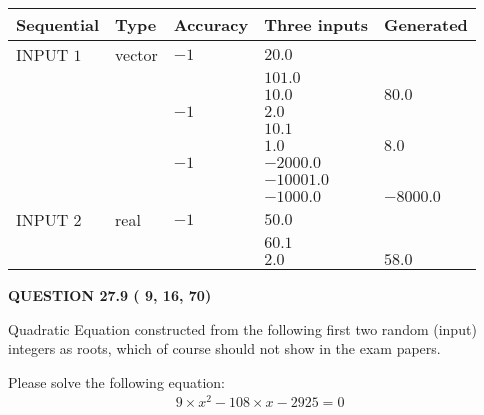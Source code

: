 \documentclass[12pt]{article}
\begin{document}
  
\noindent\begin{tabular}{|l|l|l|l|l|}
\hline
 Sequential & Type & Accuracy & Three inputs & Generated \\ 
\hline
 
 
  INPUT $           1$ & vector & $          -1 $ & $
20.0
  $ & \\
  & & & $
101.0
  $ & \\
  & & & $
10.0
$ & $ 80.0 $ 
  \\
  & & $          -1 $ & $
2.0
  $ & \\
  & & & $
10.1
  $ & \\
  & & & $
1.0
$ & $ 8.0 $ 
  \\
  & & $          -1 $ & $
-2000.0
  $ & \\
  & & & $
-10001.0
  $ & \\
  & & & $
-1000.0
$ & $ -8000.0 $ 
 \\  \hline  
 
 
  INPUT $           2$ & real & $          -1 $ & $
 50.0
  $ & \\
  & & &  $
 60.1
  $ & \\
  & & &  $
 2.0
 $ & $ 58.0 $ 
 \\  \hline  
 \end{tabular}
   
   
  
\vspace{0.2in}
  
{\textbf{\Large{QUESTION
27.9 
 (          9,         16,         70)
}}}
  
  


\noindent{}
Quadratic Equation constructed from the following first two random (input) integers as roots,  
which of course should not show in the exam papers.  
\noindent{}


 
 

 
Please solve the following equation:
\begin{eqnarray*}
9 \times x^2  %
-108
                 \times x    %
-2925 =0
\end{eqnarray*}
 
 
 
\noindent{}
 
 
\end{document}
